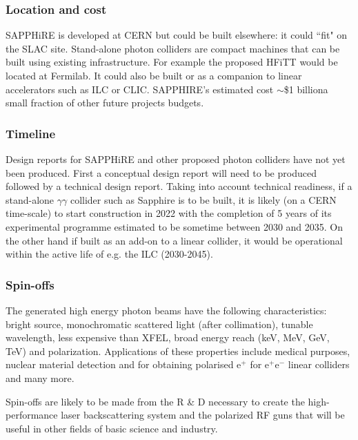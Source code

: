 \subsubsection{Location and cost}
SAPPHiRE is developed at CERN but could be built elsewhere: it could ``fit" on the SLAC site. Stand-alone photon colliders are compact machines that can be built using existing infrastructure. For example the proposed HFiTT would be located at Fermilab\cite{Chou:Higgs}. It could also be built or as a companion to linear accelerators such as ILC or CLIC. SAPPHIRE's estimated cost $\sim$\$1 billion\textemdash a small fraction of other future projects budgets. 

\subsubsection{Timeline}
Design reports for SAPPHiRE and other proposed photon colliders have not yet been produced. First a conceptual design report will need to be produced followed by a technical design report. 
Taking into account technical readiness, if a stand-alone $\gamma\gamma$ collider such as Sapphire is to be built, it is likely (on a CERN time-scale) to start construction in 2022 with the completion of 5 years of its experimental programme estimated to be sometime between 2030 and 2035. On the other hand if built as an add-on to a linear collider, it would be operational within the active life of e.g. the ILC (2030-2045)\cite{Blondel:HiggsF}.

\subsubsection{Spin-offs}
The generated high energy photon beams have the following characteristics: bright source, monochromatic scattered light (after collimation), tunable wavelength, less expensive than XFEL, broad energy reach (keV, MeV, GeV, TeV) and polarization. Applications of these properties include medical purposes, nuclear material detection and for obtaining polarised e$^{+}$ for e$^{+}$e$^{-}$ linear colliders and many more\cite{Telnov:Overview}.

Spin-offs are likely to be made from the R \& D necessary to create the high-performance laser backscattering system and the polarized RF guns that will be useful in other fields of basic science and industry.


